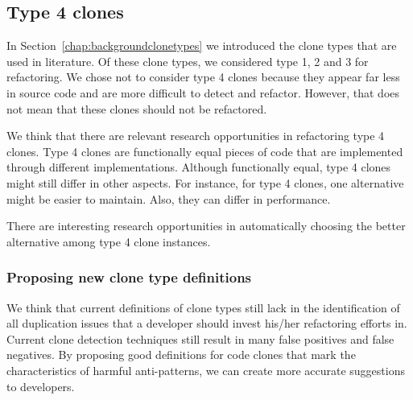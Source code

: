 

\subsection{Type 4 clones}
In Section~\ref{chap:backgroundclonetypes} we introduced the clone types that are used in literature. Of these clone types, we considered type 1, 2 and 3 for refactoring. We chose not to consider type 4 clones because they appear far less in source code and are more difficult to detect and refactor. However, that does not mean that these clones should not be refactored.

We think that there are relevant research opportunities in refactoring type 4 clones. Type 4 clones are functionally equal pieces of code that are implemented through different implementations. Although functionally equal, type 4 clones might still differ in other aspects. For instance, for type 4 clones, one alternative might be easier to maintain. Also, they can differ in performance.

There are interesting research opportunities in automatically choosing the better alternative among type 4 clone instances.

\subsubsection{Proposing new clone type definitions}
We think that current definitions of clone types still lack in the identification of all duplication issues that a developer should invest his/her refactoring efforts in. Current clone detection techniques still result in many false positives and false negatives. By proposing good definitions for code clones that mark the characteristics of harmful anti-patterns, we can create more accurate suggestions to developers.

